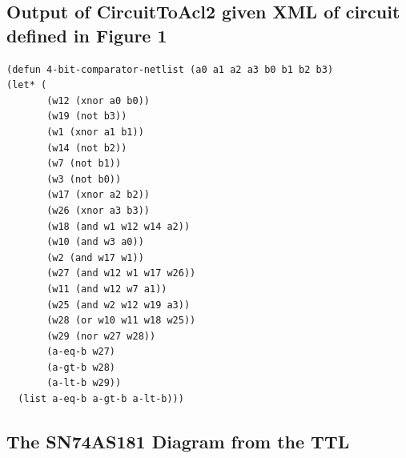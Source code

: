 \documentclass[fleqn,10pt]{SelfArx} %
\begin{document}
\subsection*{Output of CircuitToAcl2 given XML of circuit defined in Figure 1}
\begin{lstlisting}
(defun 4-bit-comparator-netlist (a0 a1 a2 a3 b0 b1 b2 b3)   
(let* (          
       (w12 (xnor a0 b0))          
       (w19 (not b3))          
       (w1 (xnor a1 b1))          
       (w14 (not b2))          
       (w7 (not b1))          
       (w3 (not b0))          
       (w17 (xnor a2 b2))          
       (w26 (xnor a3 b3))          
       (w18 (and w1 w12 w14 a2))          
       (w10 (and w3 a0))          
       (w2 (and w17 w1))          
       (w27 (and w12 w1 w17 w26))          
       (w11 (and w12 w7 a1))          
       (w25 (and w2 w12 w19 a3))          
       (w28 (or w10 w11 w18 w25))          
       (w29 (nor w27 w28))          
       (a-eq-b w27)          
       (a-gt-b w28)          
       (a-lt-b w29))     
  (list a-eq-b a-gt-b a-lt-b)))
\end{lstlisting}

\subsection*{The SN74AS181 Diagram from the TTL \cite{TTL}}
\end{document}
